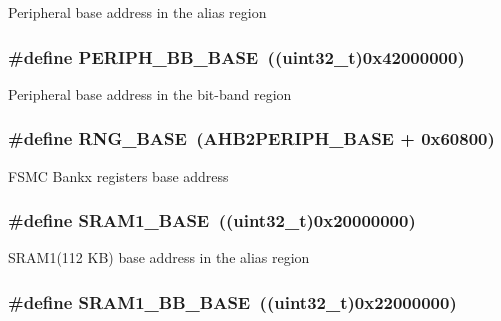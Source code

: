 Peripheral base address in the alias region \hypertarget{group___peripheral__memory__map_gaed7efc100877000845c236ccdc9e144a}{
\subsubsection[{P\-E\-R\-I\-P\-H\-\_\-\-B\-B\-\_\-\-B\-A\-S\-E}]{\setlength{\rightskip}{0pt plus 5cm}\#define P\-E\-R\-I\-P\-H\-\_\-\-B\-B\-\_\-\-B\-A\-S\-E~((uint32\-\_\-t)0x42000000)}}\label{group___peripheral__memory__map_gaed7efc100877000845c236ccdc9e144a}
Peripheral base address in the bit-\/band region \hypertarget{group___peripheral__memory__map_gab92662976cfe62457141e5b4f83d541c}{
\subsubsection[{R\-N\-G\-\_\-\-B\-A\-S\-E}]{\setlength{\rightskip}{0pt plus 5cm}\#define R\-N\-G\-\_\-\-B\-A\-S\-E~({\bf A\-H\-B2\-P\-E\-R\-I\-P\-H\-\_\-\-B\-A\-S\-E} + 0x60800)}}\label{group___peripheral__memory__map_gab92662976cfe62457141e5b4f83d541c}
F\-S\-M\-C Bankx registers base address \hypertarget{group___peripheral__memory__map_ga7d0fbfb8894012dbbb96754b95e562cd}{
\subsubsection[{S\-R\-A\-M1\-\_\-\-B\-A\-S\-E}]{\setlength{\rightskip}{0pt plus 5cm}\#define S\-R\-A\-M1\-\_\-\-B\-A\-S\-E~((uint32\-\_\-t)0x20000000)}}\label{group___peripheral__memory__map_ga7d0fbfb8894012dbbb96754b95e562cd}
S\-R\-A\-M1(112 K\-B) base address in the alias region \hypertarget{group___peripheral__memory__map_gac4c4f61082e4b168f29d9cf97dc3ca5c}{
\subsubsection[{S\-R\-A\-M1\-\_\-\-B\-B\-\_\-\-B\-A\-S\-E}]{\setlength{\rightskip}{0pt plus 5cm}\#define S\-R\-A\-M1\-\_\-\-B\-B\-\_\-\-B\-A\-S\-E~((uint32\-\_\-t)0x22000000)}}\label{group___peripheral__memory__map_gac4c4f61082e4b168f29d9cf97dc3ca5c}
